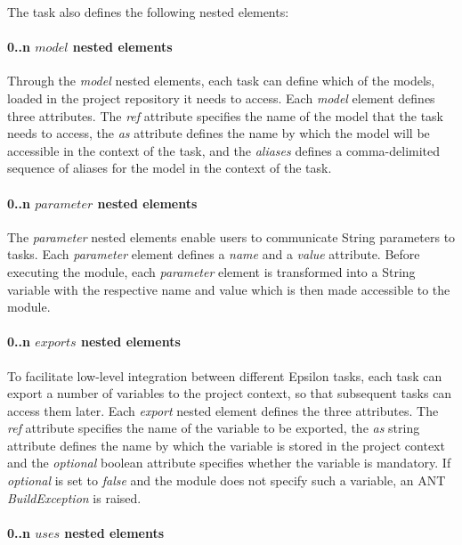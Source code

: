 The task also defines the following nested elements:

\paragraph{0..n $model$ nested elements}

Through the \emph{model} nested elements, each task can define which of the models, loaded in the project repository it needs to access. Each \emph{model} element defines three attributes. The \emph{ref} attribute specifies the name of the model that the task needs to access, the \emph{as} attribute defines the name by which the model will be accessible in the context of the task, and the \emph{aliases} defines a comma-delimited sequence of aliases for the model in the context of the task.

\paragraph{0..n $parameter$ nested elements}

The \emph{parameter} nested elements enable users to communicate String parameters to tasks. Each \emph{parameter} element defines a \emph{name} and a \emph{value} attribute. Before executing the module, each \emph{parameter} element is transformed into a String variable with the respective name and value which is then made accessible to the module.

\paragraph{0..n $exports$ nested elements}

To facilitate low-level integration between different Epsilon tasks, each task can export a number of variables to the project context, so that subsequent tasks can access them later. Each \emph{export} nested element defines the three attributes. The \emph{ref} attribute specifies the name of the variable to be exported, the \emph{as} string attribute defines the name by which the variable is stored in the project context and the \emph{optional} boolean attribute specifies whether the variable is mandatory. If \emph{optional} is set to \emph{false} and the module does not specify such a variable, an ANT \emph{BuildException} is raised.

\paragraph{0..n $uses$ nested elements}

